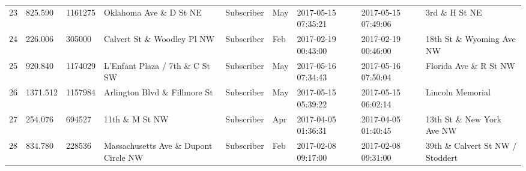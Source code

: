 \documentclass[11pt]{article}
\begin{document}
\begin{tabular}{r|llllllll}
	23 &  825.590                                                & 1161275                                                 & Oklahoma Ave \& D St NE                                & Subscriber                                              & May                                                     & 2017-05-15 07:35:21                                     & 2017-05-15 07:49:06                                     & 3rd \& H St NE                                        \\
	24 &  226.006                                                &  305000                                                 & Calvert St \& Woodley Pl NW                            & Subscriber                                              & Feb                                                     & 2017-02-19 00:43:00                                     & 2017-02-19 00:46:00                                     & 18th St \& Wyoming Ave NW                             \\
	25 &  920.840                                                & 1174029                                                 & L'Enfant Plaza / 7th \& C St SW                        & Subscriber                                              & May                                                     & 2017-05-16 07:34:43                                     & 2017-05-16 07:50:04                                     & Florida Ave \& R St NW                                \\
	26 & 1371.512                                                & 1157984                                                 & Arlington Blvd \& Fillmore St                          & Subscriber                                              & May                                                     & 2017-05-15 05:39:22                                     & 2017-05-15 06:02:14                                     & Lincoln Memorial                                       \\
	27 &  254.076                                                &  694527                                                 & 11th \& M St NW                                        & Subscriber                                              & Apr                                                     & 2017-04-05 01:36:31                                     & 2017-04-05 01:40:45                                     & 13th St \& New York Ave NW                            \\
	28 &  834.780                                                &  228536                                                 & Massachusetts Ave \& Dupont Circle NW                  & Subscriber                                              & Feb                                                     & 2017-02-08 09:17:00                                     & 2017-02-08 09:31:00                                     & 39th \& Calvert St NW / Stoddert                      \\

\end{tabular}
\end{document}
